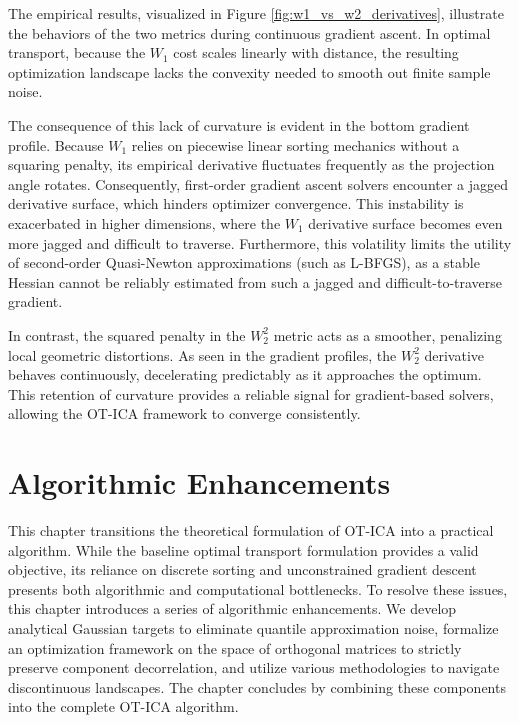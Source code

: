 \documentclass[12pt,a4paper,twoside,openany]{book}
\begin{document}
The empirical results, visualized in Figure \ref{fig:w1_vs_w2_derivatives}, illustrate the behaviors of 
the two metrics during continuous gradient ascent. In optimal transport, because the $W_1$ cost scales linearly with distance, 
the resulting optimization landscape lacks the convexity needed to smooth out finite sample noise.

The consequence of this lack of curvature is evident in the bottom gradient profile. Because $W_1$ relies on 
piecewise linear sorting mechanics without a squaring penalty, its empirical derivative fluctuates frequently 
as the projection angle rotates. Consequently, first-order gradient ascent solvers encounter a jagged derivative surface, 
which hinders optimizer convergence. This instability is exacerbated in higher dimensions, where the $W_1$ 
derivative surface becomes even more jagged and difficult to traverse. Furthermore, this volatility limits 
the utility of second-order Quasi-Newton approximations (such as L-BFGS), as a stable Hessian cannot be reliably estimated 
from such a jagged and difficult-to-traverse gradient.

In contrast, the squared penalty in the $W_2^2$ metric acts as a smoother, penalizing local geometric distortions. 
As seen in the gradient profiles, the $W_2^2$ derivative behaves continuously, decelerating predictably as it approaches the optimum. 
This retention of curvature provides a reliable signal for gradient-based solvers, allowing the OT-ICA framework to converge consistently.


\chapter{Algorithmic Enhancements}

This chapter transitions the theoretical formulation of OT-ICA into a practical algorithm. 
While the baseline optimal transport formulation provides a valid objective, its reliance on discrete sorting and unconstrained 
gradient descent presents both algorithmic and computational bottlenecks. To resolve these issues, this chapter introduces a series 
of algorithmic enhancements. We develop analytical Gaussian targets to eliminate quantile approximation noise, formalize 
an optimization framework on the space of orthogonal matrices to strictly preserve component decorrelation, and utilize 
various methodologies to navigate discontinuous landscapes. The chapter concludes by 
combining these components into the complete OT-ICA algorithm.
\end{document}
